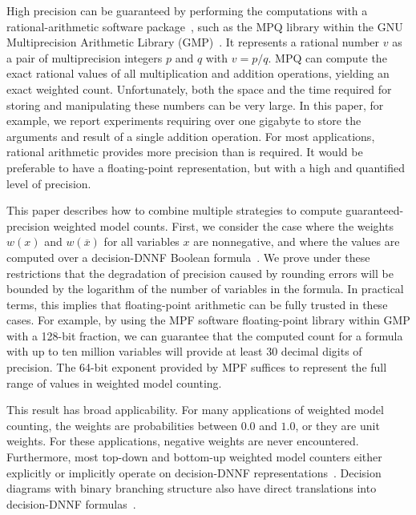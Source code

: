 \documentclass[letterpaper,USenglish,cleveref, autoref, thm-restate]{lipics-v2021}
\newcommand{\obar}[1]{\overline{#1}}
\begin{document}
High precision can be guaranteed by performing the
computations with a rational-arithmetic software package~\cite{knuth:rational:1981}, such as the
MPQ library within the GNU Multiprecision Arithmetic
Library (GMP)~\cite{granlund:gmp:2015}.  It represents a rational number $v$ as a
pair of multiprecision integers $p$ and $q$ with $v = p/q$.
MPQ
can compute the exact rational values of all multiplication and
addition operations, yielding an exact weighted count.  Unfortunately,
both the space and the time required for storing and manipulating these numbers can be very
large.
In this paper, for example, we report experiments requiring over one gigabyte
to store the arguments and result of a single addition operation.
For most applications, rational arithmetic provides more precision than is required.
It would be preferable to have a floating-point
representation, but with a high and quantified level of precision.

This paper describes how to combine multiple strategies to compute 
guaranteed-precision weighted model counts.  First, we consider the
case where the weights $w(x)$ and $w(\obar{x})$ for all variables $x$ are nonnegative, and
where the values are computed over a decision-DNNF Boolean
formula~\cite{beame:uai:2013,huang:jair:2007}.
We prove under these restrictions
that the degradation of
precision caused by rounding errors will be bounded by the logarithm
of the number of variables in the formula.  In practical terms, this
implies that floating-point arithmetic can be fully trusted in these
cases.  For example, by using the MPF software floating-point library
within GMP with a 128-bit fraction, we can guarantee that the computed
count for a formula with up to ten million variables will provide at least
30 decimal digits of precision.
The 64-bit exponent provided by MPF suffices to represent the full range of values in weighted model counting.

This result has broad applicability.
For many applications
of weighted model counting, the weights are probabilities between
$0.0$ and $1.0$, or they are unit weights.  For these applications,  negative weights are never encountered.
Furthermore, most top-down and bottom-up weighted model
counters either explicitly or implicitly operate on decision-DNNF
representations~\cite{beame:uai:2013}.  
Decision diagrams with binary branching structure
also have direct translations into decision-DNNF formulas~\cite{huang:jair:2007,oztok:cp:2014}.
\end{document}
